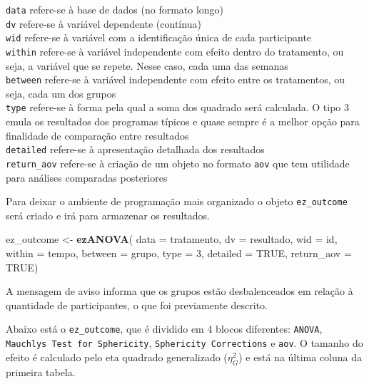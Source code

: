 \documentclass[
]{book}
\newenvironment{Shaded}{\begin{snugshade}}{\end{snugshade}}
\newcommand{\DataTypeTok}[1]{\textcolor[rgb]{0.13,0.29,0.53}{#1}}
\newcommand{\DecValTok}[1]{\textcolor[rgb]{0.00,0.00,0.81}{#1}}
\newcommand{\KeywordTok}[1]{\textcolor[rgb]{0.13,0.29,0.53}{\textbf{#1}}}
\newcommand{\NormalTok}[1]{#1}
\newcommand{\OtherTok}[1]{\textcolor[rgb]{0.56,0.35,0.01}{#1}}
\newcommand{\StringTok}[1]{\textcolor[rgb]{0.31,0.60,0.02}{#1}}
\begin{document}
\texttt{data} refere-se à base de dados (no formato longo)\\
\texttt{dv} refere-se à variável dependente (contínua)\\
\texttt{wid} refere-se à variável com a identificação única de cada participante\\
\texttt{within} refere-se à variável independente com efeito dentro do tratamento, ou seja, a variável que se repete. Nesse caso, cada uma das semanas\\
\texttt{between} refere-se à variável independente com efeito entre os tratamentos, ou seja, cada um dos grupos\\
\texttt{type} refere-se à forma pela qual a soma dos quadrado será calculada. O tipo 3 emula os resultados dos programas típicos e quase sempre é a melhor opção para finalidade de comparação entre resultados\\
\texttt{detailed} refere-se à apresentação detalhada dos resultados\\
\texttt{return\_aov} refere-se à criação de um objeto no formato \texttt{aov} que tem utilidade para análises comparadas posteriores

Para deixar o ambiente de programação mais organizado o objeto \texttt{ez\_outcome} será criado e irá para armazenar os resultados.

\begin{Shaded}
\begin{Highlighting}[]
\NormalTok{ez_outcome <-}\StringTok{ }\KeywordTok{ezANOVA}\NormalTok{(}
  \DataTypeTok{data =}\NormalTok{ tratamento,}
  \DataTypeTok{dv =}\NormalTok{ resultado,}
  \DataTypeTok{wid =}\NormalTok{ id,}
  \DataTypeTok{within =}\NormalTok{ tempo,}
  \DataTypeTok{between =}\NormalTok{ grupo,}
  \DataTypeTok{type =} \DecValTok{3}\NormalTok{,}
  \DataTypeTok{detailed =} \OtherTok{TRUE}\NormalTok{,}
  \DataTypeTok{return_aov =} \OtherTok{TRUE}\NormalTok{)}
\end{Highlighting}
\end{Shaded}

A mensagem de aviso informa que os grupos estão desbalenceados em relação à quantidade de participantes, o que foi previamente descrito.

Abaixo está o \texttt{ez\_outcome}, que é dividido em 4 blocos diferentes: \texttt{ANOVA}, \texttt{Mauchly\textquotesingle{}s\ Test\ for\ Sphericity}, \texttt{Sphericity\ Corrections} e \texttt{aov}. O tamanho do efeito é calculado pelo eta quadrado generalizado (\(\eta^2_G\)) e está na última coluna da primeira tabela.
\end{document}
